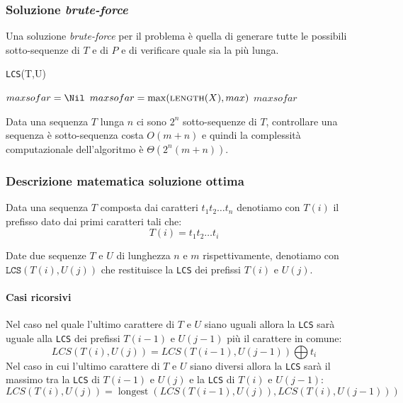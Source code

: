         \subsubsection{Soluzione \textit{brute-force}}
            Una soluzione \textit{brute-force} per il problema è quella di generare tutte le possibili sotto-sequenze di $T$ e di $P$ e di verificare quale sia la più lunga.
            \begin{algorithm}[H]
                \caption{\Int \texttt{LCS}(\Item[] T,\Item U)}
                \begin{algorithmic}
                    \State \Item[] $maxsofar = \Nil$
                            \State $maxsofar = \max(\Call{length}{X}, max)$
                        \EndIf
                    \EndFor
                    \State \Return $maxsofar$
                \end{algorithmic}
            \end{algorithm}
            Data una sequenza $T$ lunga $n$ ci sono $2^n$ sotto-sequenze di $T$, controllare una sequenza è sotto-sequenza costa $O(m+n)$ e quindi la complessità computazionale dell'algoritmo è $\Theta(2^n(m+n))$.
        
        \subsubsection{Descrizione matematica soluzione ottima} 
            \begin{definition}[Prefisso]
                Data una sequenza $T$ composta dai caratteri $t_1t_2\dots t_n$ denotiamo con $T(i)$ il prefisso dato dai primi caratteri tali che: $$
                    T(i)=t_1t_2\dots t_i
                $$
            \end{definition}
            Date due sequenze $T$ e $U$ di lunghezza $n$ e $m$ rispettivamente, denotiamo con $\texttt{LCS}(T(i),U(j))$ che restituisce la \texttt{LCS} dei prefissi $T(i)$ e $U(j)$.
            \paragraph{Casi ricorsivi} Nel caso nel quale l'ultimo carattere di $T$ e $U$ siano uguali allora la \texttt{LCS} sarà uguale alla \texttt{LCS} dei prefissi $T(i-1)$ e $U(j-1)$ più il carattere in comune:
            $$
                LCS(T(i),U(j))=LCS(T(i-1),U(j-1)) \bigoplus t_i
            $$
            Nel caso in cui l'ultimo carattere di $T$ e $U$ siano diversi allora la \texttt{LCS} sarà il massimo tra la \texttt{LCS} di $T(i-1)$ e $U(j)$ e la \texttt{LCS} di $T(i)$ e $U(j-1)$: $$
                LCS(T(i),U(j))=\operatorname{longest}(LCS(T(i-1),U(j)), LCS(T(i),U(j-1)))
            $$
